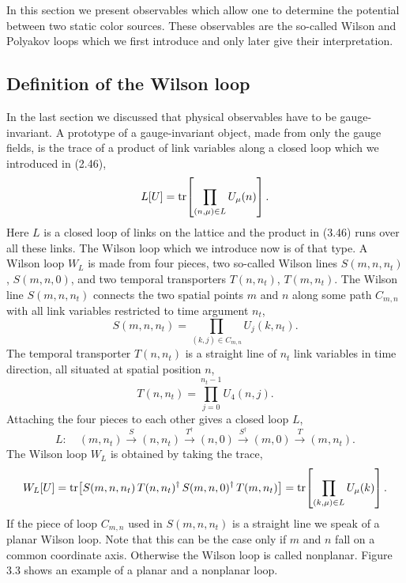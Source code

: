 In this section we present observables which allow one to determine the
potential between two static color sources. These observables are the so-called
Wilson and Polyakov loops which we first introduce and only later give their
interpretation.

\subsection{Definition of the Wilson loop}

In the last section we discussed that physical observables have to be
gauge-invariant. A prototype of a gauge-invariant object, made from only the
gauge fields, is the trace of a product of link variables along a closed loop
which we introduced in (2.46),
\begin{equation}
  L[U] = \operatorname{tr}\!\left[\prod_{(n,\mu)\in L} U_\mu(n)\right] .
\end{equation}
Here $L$ is a closed loop of links on the lattice and the product in (3.46)
runs over all these links. The Wilson loop which we introduce now is of that
type. A Wilson loop $W_L$ is made from four pieces, two so-called Wilson lines
$S(m, n, n_t)$, $S(m, n, 0)$, and two temporal transporters $T(n, n_t)$,
$T(m, n_t)$. The Wilson line $S(m, n, n_t)$ connects the two spatial points $m$
and $n$ along some path $C_{m,n}$ with all link variables restricted to time
argument $n_t$,
\begin{equation}
  S(m, n, n_t) = \prod_{(k,j)\in C_{m,n}} U_j(k, n_t) .
\end{equation}
The temporal transporter $T(n, n_t)$ is a straight line of $n_t$ link variables
in time direction, all situated at spatial position $n$,
\begin{equation}
  T(n, n_t) = \prod_{j=0}^{n_t-1} U_4(n, j) .
\end{equation}
Attaching the four pieces to each other gives a closed loop $L$,
\begin{equation}
  L: \quad (m, n_t) \xrightarrow{S} (n, n_t) \xrightarrow{T^\dagger} (n, 0)
     \xrightarrow{S^\dagger} (m, 0) \xrightarrow{T} (m, n_t) .
\end{equation}
The Wilson loop $W_L$ is obtained by taking the trace,
\begin{equation}
  W_L[U] = \operatorname{tr}\!\left[S(m, n, n_t)\,T(n, n_t)^\dagger\,S(m, n, 0)^\dagger\,
    T(m, n_t)\right]
  = \operatorname{tr}\!\left[\prod_{(k,\mu)\in L} U_\mu(k)\right] .
\end{equation}
If the piece of loop $C_{m,n}$ used in $S(m, n, n_t)$ is a straight line we
speak of a planar Wilson loop. Note that this can be the case only if $m$ and
$n$ fall on a common coordinate axis. Otherwise the Wilson loop is called
nonplanar. Figure 3.3 shows an example of a planar and a nonplanar loop.

